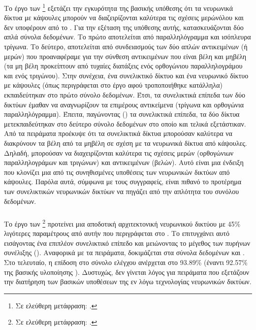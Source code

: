 Το έργο των  \footnote{Σε ελεύθερη μετάφραση: .} \cite{manogaran2020capsnet} εξετάζει την εγκυρότητα της βασικής υπόθεσης ότι τα νευρωνικά δίκτυα με κάψουλες μπορούν να διαζειρίζονται καλύτερα τις σχέσεις μερών\textendash όλου και δεν υποφέρουν από το . Για την εξέταση της υπόθεσης αυτής, κατασκευάζονται δύο απλά σύνολα δεδομένων. Το πρώτο αποτελείται από παραλληλόγραμμα και ισόπλευρα τρίγωνα. Το δεύτερο, αποτελείται από συνδειασμούς των δύο απλών αντικειμένων (ή μερών) που προαναφέραμε για την σύνθεση αντικειμένων που είναι βέλη και μη\textendash βέλη (τα μη βέλη προκείπτουν από τυχαίες διατάξεις ενός ορθογώνιου παραλληλογράμου και ενός τριγώνου). Στην συνέχεια, ένα συνελικτικό δίκτυο και ένα νευρωνικό δίκτυο με κάψουλες (όπως περιγράφεται στο έργο \cite{sabour2017dynamic} αφού τροποποιήθηκε κατάλληλα) εκπαιδεύτηκαν στο πρώτο σύνολο δεδομένων. Έτσι, τα συνελικτικά επίπεδα των δύο δικτύων έμαθαν να αναγνωρίζουν τα επιμέρους αντικείμενα (τρίγωνα και ορθογώνια παραλληλόγραμμα). Έπειτα, παγώνοντας () τα συνελικτικά επίπεδα, τα δύο δίκτυα μετεκπαιδεύτηκαν στο δεύτερο σύνολο δεδομένων στο οποίο και τελικά εξετάστικαν. Από τα πειράματα προέκυψε ότι τα συνελικτικά δίκτυα μπορούσαν καλύτερα να διακρύνουν τα βέλη από τα μη\textendash βέλη σε σχέση με τα νευρωνικά δίκτυα από κάψουλες. Δηλαδή, μπορούσαν να διαχειρίζονται καλύτερα τις σχέσεις μερών (ορθογώνιων παραλληλογράμων και τριγώνων) και αντικειμένων (βελών). Αυτό είναι μια ένδειξη που κλονίζει μια από τις συνηθισμένες υποθέσεις των νευρωνικών δικτύων από κάψουλες. Παρόλα αυτά, σύμφωνα με τους συγγραφείς, είναι πιθανό το προτέρημα των συνελικτικών νευρωνικών δικτύων να πηγάζει από την απλότητα του συνόλου δεδομένων.


\subsubsection{}

Το έργο των  \footnote{Σε ελεύθερη μετάφραση: .} \cite{luo2019r} προτείνει μια αποδοτική αρχιτεκτονική νευρωνικού δικτύου με 45\% λιγότερες παραμέτρους από αυτήν που περιγράφεται στο \cite{sabour2017dynamic}. Το επιτυγχάνει αυτό εισάγοντας ένα επιπλέον συνελικτικό επίπεδο και μειώνοντας το μέγεθος των πυρήνων συνέλιξης (). Αναφορικά με τα πειράματα, δοκιμάζεται στα σύνολα δεδομένων  και . Στο τελευταίο, η επίδοση στο σύνολο ελέγχου ανέρχεται στο 93.89\% (έναντι 92.57\% της βασικής υλοποίησης \cite{sabour2017dynamic}). Δυστυχώς, δεν γίνεται λόγος για πειράματα που εξετάζουν την διατήρηση των βασικών υποθέσεων της εν λόγω τεχνολογίας νευρωνικών δικτύων.

